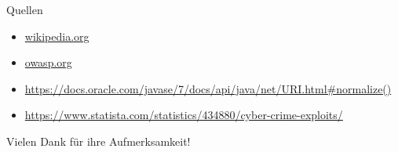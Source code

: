 \documentclass[10pt]{beamer}
\begin{document}
\begin{frame}[fragile]{Quellen}
  \begin{itemize}
    \item \url{wikipedia.org}
    \item \url{owasp.org}
    \item \url{https://docs.oracle.com/javase/7/docs/api/java/net/URI.html#normalize()}
    \item \url{https://www.statista.com/statistics/434880/cyber-crime-exploits/}
  \end{itemize}
\end{frame}

\begin{frame}[fragile]{}
  \huge Vielen Dank f\"ur ihre Aufmerksamkeit!
\end{frame}
\end{document}
